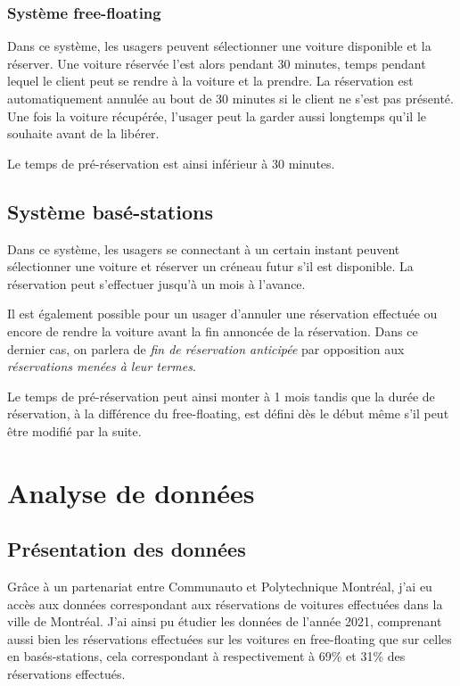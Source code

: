 \documentclass[12pt,a4paper]{article}
\theoremstyle{definition}
\begin{document}
\subsubsection{Système free-floating}

Dans ce système, les usagers peuvent sélectionner une voiture disponible et la réserver. Une voiture réservée l'est alors pendant 30 minutes, temps pendant lequel le client peut se rendre à la voiture et la prendre. La réservation est automatiquement annulée au bout de 30 minutes si le client ne s'est pas présenté. Une fois la voiture récupérée, l'usager peut la garder aussi longtemps qu'il le souhaite avant de la libérer.

Le temps de pré-réservation est ainsi inférieur à 30 minutes.

\subsection{Système basé-stations}

Dans ce système, les usagers se connectant à un certain instant peuvent sélectionner une voiture et réserver un créneau futur s'il est disponible. La réservation peut s'effectuer jusqu'à un mois à l'avance.

Il est également possible pour un usager d'annuler une réservation effectuée ou encore de rendre la voiture avant la fin annoncée de la réservation. Dans ce dernier cas, on parlera de \emph{fin de réservation anticipée} par opposition aux \emph{réservations menées à leur termes}.

Le temps de pré-réservation peut ainsi monter à 1 mois tandis que la durée de réservation, à la différence du free-floating, est défini dès le début même s'il peut être modifié par la suite.






\section{Analyse de données}
\subsection{Présentation des données}

Grâce à un partenariat entre Communauto et Polytechnique Montréal, j'ai eu accès aux données correspondant aux réservations de voitures effectuées dans la ville de Montréal. 
J'ai ainsi pu étudier les données de l'année 2021, comprenant  aussi bien les réservations effectuées sur les voitures en free-floating que sur celles en basés-stations, cela correspondant à respectivement à 69\% et 31\% des réservations effectués.
\end{document}
